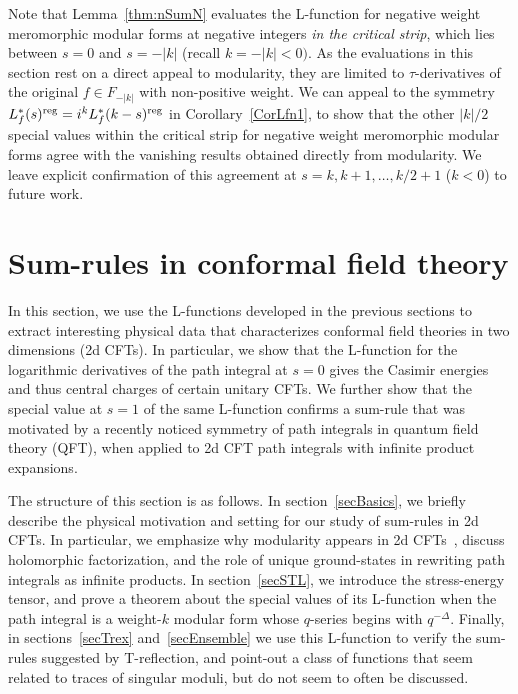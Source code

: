 \documentclass[11pt,a4paper]{article}
\newcommand{\reg}{{\rm reg}}
\begin{document}
Note that Lemma~\ref{thm:nSumN} evaluates the L-function for negative weight meromorphic modular forms at negative integers {\em in the critical strip}, which lies between $s = 0$ and $s = -|k|$ (recall $k = -|k| < 0)$. As the evaluations in this section rest on a direct appeal to modularity, they are limited to $\tau$-derivatives of the original $f \in F_{-|k|}$ with non-positive weight.  We can appeal to the symmetry $L_f^*(s)^\reg = i^k L_f^*(k-s)^{\reg}$ in Corollary~\ref{CorLfn1}, to show that the other $|k|/2$ special values within the critical strip for negative weight meromorphic modular forms agree with the vanishing results obtained directly from modularity. We leave explicit confirmation of this agreement at $s = k, k+1, \ldots, k/2+1$ ($k < 0$) to future work.





\section{Sum-rules in conformal field theory}\label{secQFT}

In this section, we use the L-functions developed in the previous sections to extract interesting physical data that characterizes conformal field theories in two dimensions (2d CFTs). In particular, we show that the L-function for the logarithmic derivatives of the path integral at $s = 0$ gives the Casimir energies and thus central charges of certain unitary CFTs. We further show that the special value at $s = 1$ of the same L-function confirms a sum-rule that was motivated by a recently noticed symmetry of path integrals in quantum field theory (QFT), when applied to 2d CFT path integrals with infinite product expansions. 

The structure of this section is as follows. In section~\ref{secBasics}, we briefly describe the physical motivation and setting for our study of sum-rules in 2d CFTs. In particular, we emphasize why modularity appears in 2d CFTs~\cite{08-Yellow}, discuss holomorphic factorization, and the role of unique ground-states in rewriting path integrals as infinite products. In section~\ref{secSTL}, we introduce the stress-energy tensor, and prove a theorem about the special values of its L-function when the path integral is a weight-$k$ modular form whose $q$-series begins with $q^{-\Delta}$. Finally, in sections~\ref{secTrex} and~\ref{secEnsemble} we use this L-function to verify the sum-rules suggested by T-reflection, and point-out a class of functions that seem related to traces of singular moduli, but do not seem to often be discussed.
\end{document}
